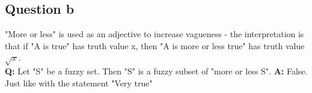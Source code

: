 \subsection{Question b}
"More or less" is used as an adjective to increase vagueness - the interpretation is that if "A is true" has truth value x, then "A is more or less true" has truth value $\sqrt{x}$.\\
\textbf{Q: }Let "S" be a fuzzy set. Then "S" is a fuzzy subset of "more or less S".
\textbf{A: }False. Just like with the statement "Very true"

	





